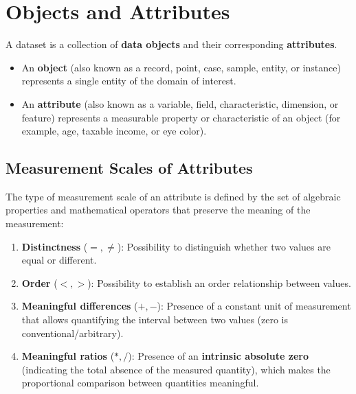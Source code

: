 
\section{Objects and Attributes}

A dataset is a collection of \textbf{data objects} and their corresponding \textbf{attributes}.
\begin{itemize}
    \item An \textbf{object} (also known as a record, point, case, sample, entity, or instance) represents a single entity of the domain of interest.
    \item An \textbf{attribute} (also known as a variable, field, characteristic, dimension, or feature) represents a measurable property or characteristic of an object (for example, age, taxable income, or eye color).
\end{itemize}

\subsection{Measurement Scales of Attributes}
The type of measurement scale of an attribute is defined by the set of algebraic properties and mathematical operators that preserve the meaning of the measurement:
\begin{enumerate}
    \item \textbf{Distinctness} ($=, \neq$): Possibility to distinguish whether two values are equal or different.
    \item \textbf{Order} ($<, >$): Possibility to establish an order relationship between values.
    \item \textbf{Meaningful differences} ($+, -$): Presence of a constant unit of measurement that allows quantifying the interval between two values (zero is conventional/arbitrary).
    \item \textbf{Meaningful ratios} ($*, /$): Presence of an \textbf{intrinsic absolute zero} (indicating the total absence of the measured quantity), which makes the proportional comparison between quantities meaningful.
\end{enumerate}

